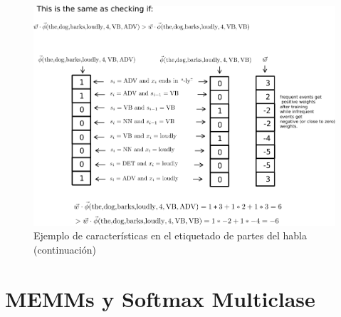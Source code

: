 \begin{figure}[h]
\caption{Ejemplo de características en el etiquetado de partes del habla (continuación)}
\centering
\includegraphics[scale = 0.6]{pics/CRF2.pdf}
\end{figure}

\section{MEMMs y Softmax Multiclase}

